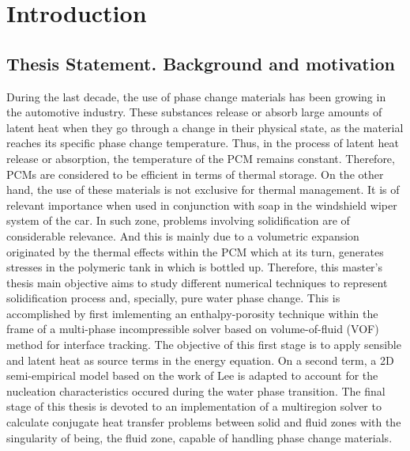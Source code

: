 
\chapter{Introduction} %

\label{Chapter1} %


\newcommand{\keyword}[1]{\textbf{#1}}
\newcommand{\tabhead}[1]{\textbf{#1}}
\newcommand{\code}[1]{\texttt{#1}}
\newcommand{\file}[1]{\texttt{\bfseries#1}}
\newcommand{\option}[1]{\texttt{\itshape#1}}
\setcounter{secnumdepth}{4}

\section{Thesis Statement. Background and motivation}

During the last decade, the use of phase change materials has been growing in the automotive industry. \newline
These substances release or absorb large amounts of latent heat when they go through a change in their physical state, as the material reaches its specific phase change temperature. Thus, in the process of latent heat release or absorption, the temperature of the PCM remains constant. Therefore, PCMs are considered to be efficient in terms of thermal storage. \newline
\indent On the other hand, the use of these materials is not exclusive for thermal management. It is of relevant importance when used in conjunction with soap in the windshield wiper system of the car. In such zone, problems involving solidification are of considerable relevance. And this is mainly due to a volumetric expansion originated by the thermal effects within the PCM which at its turn, generates stresses in the polymeric tank in which is bottled up.
\newline
\indent Therefore, this master's thesis main objective aims to study different numerical techniques to represent solidification process and, specially, pure water phase change. This is accomplished by first imlementing an enthalpy-porosity technique within the frame of a multi-phase incompressible solver based on volume-of-fluid (VOF) method for interface tracking. The objective of this first stage is to apply sensible and latent heat as source terms in the energy equation. On a second term, a 2D semi-empirical model based on the work of Lee is adapted to account for the nucleation characteristics occured during the water phase transition. 
\indent The final stage of this thesis is devoted to an implementation of a multiregion solver to calculate conjugate heat transfer problems between solid and fluid zones with the singularity of being, the fluid zone, capable of handling phase change materials. 



